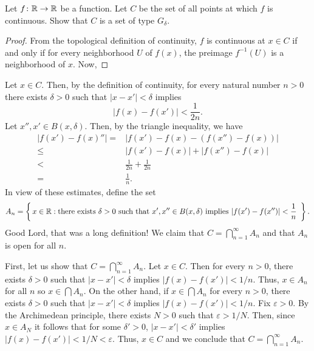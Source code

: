 \begin{problem}
Let $f\colon\mathbb{R}\to\mathbb{R}$ be a function. Let $C$ be the set of all points
at which $f$ is continuous. Show that $C$ is a set of type $G_\delta$.
\end{problem}
\begin{proof}
From the topological definition of continuity, $f$ is continuous at $x\in
C$ if and only if for every neighborhood $U$ of $f(x)$, the preimage
$f^{-1}(U)$ is a neighborhood of $x$. Now,
\end{proof}
Let $x\in C$. Then, by the definition of continuity, for every natural
number $n>0$ there exists $\delta>0$ such that $|x-x'|<\delta$ implies
\begin{equation}
\label{eq:continuity-2n}
\left|f(x)-f(x')\right|<\frac{1}{2n}.
\end{equation}
Let $x'',x'\in B(x,\delta)$. Then, by the triangle inequality, we have
\begin{equation}
\label{eq:n-estimates}
\begin{aligned}
|f(x')-f(x)''|={}&\left|f(x')-f(x)-(f(x'')-f(x))\right|\\
              \leq{}&\left|f(x')-f(x)\right|+\left|f(x'')-f(x)\right|\\
              <{}&\frac{1}{2n}+\frac{1}{2n}\\
              ={}&\frac{1}{n}.
\end{aligned}
\end{equation}
In view of these estimates, define the set
\begin{equation}
\label{eq:a-n}
A_n=
\left\{\,
x\in\mathbb{R} :\text{there exists $\delta>0$ such that $x',x''\in B(x,\delta)$ implies $\left|f(x')-f(x'')\right|<\frac{1}{n}$ }
\,\right\}.
\end{equation}
Good Lord, that was a long definition! We claim that
$C=\bigcap_{n=1}^\infty A_n$ and that $A_n$ is open for all $n$.

First, let us show that $C=\bigcap_{n=1}^\infty A_n$. Let $x\in C$. Then for
every $n>0$, there exists $\delta>0$ such that $|x-x'|<\delta$ implies
$|f(x)-f(x')|<1/n$. Thus, $x\in A_n$ for all $n$ so $x\in\bigcap A_n$. On
the other hand, if $x\in\bigcap A_n$ for every $n>0$, there exists
$\delta>0$ such that $|x-x'|<\delta$ implies $|f(x)-f(x')|<1/n$. Fix
$\varepsilon>0$. By the Archimedean principle, there exists $N>0$ such that
$\varepsilon>1/N$. Then, since $x\in A_N$ it follows that for some
$\delta'>0$, $|x-x'|<\delta'$ implies
$\left|f(x)-f(x')\right|<1/N<\varepsilon$. Thus, $x\in C$ and we conclude
that $C=\bigcap_{n=1}^\infty A_n$.

